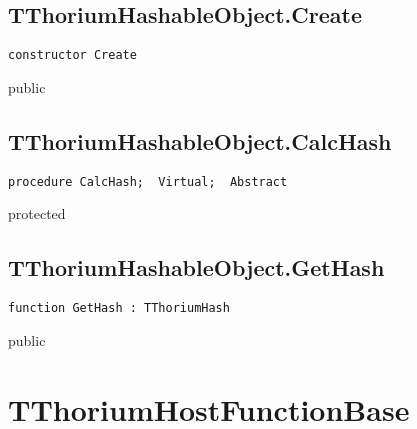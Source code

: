 \subsection{TThoriumHashableObject.Create}
\label{thoriumcore:thorium:tthoriumhashableobject:create}
\begin{FPCList}
\Synopsis
\Declaration 

\begin{verbatim}
constructor Create
\end{verbatim}
\Visibility
public
\Description
\Errors
\end{FPCList}
\subsection{TThoriumHashableObject.CalcHash}
\label{thoriumcore:thorium:tthoriumhashableobject:calchash}
\begin{FPCList}
\Synopsis
\Declaration 

\begin{verbatim}
procedure CalcHash;  Virtual;  Abstract
\end{verbatim}
\Visibility
protected
\Description
\Errors
\end{FPCList}
\subsection{TThoriumHashableObject.GetHash}
\label{thoriumcore:thorium:tthoriumhashableobject:gethash}
\begin{FPCList}
\Synopsis
\Declaration 

\begin{verbatim}
function GetHash : TThoriumHash
\end{verbatim}
\Visibility
public
\Description
\Errors
\end{FPCList}
\section{TThoriumHostFunctionBase}
\label{thoriumcore:thorium:tthoriumhostfunctionbase}
